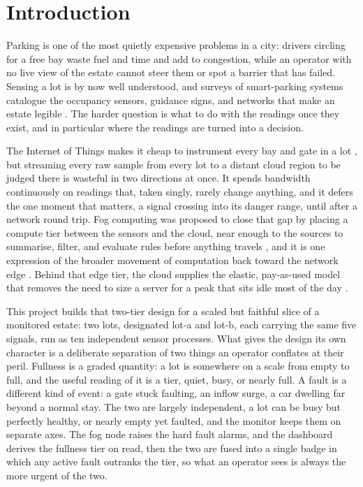 \documentclass[conference]{IEEEtran}
\begin{document}
\section{Introduction}

Parking is one of the most quietly expensive problems in a city: drivers circling for a free bay waste fuel and time and add to congestion, while an operator with no live view of the estate cannot steer them or spot a barrier that has failed. Sensing a lot is by now well understood, and surveys of smart-parking systems catalogue the occupancy sensors, guidance signs, and networks that make an estate legible \cite{lin2017, polycarpou2013}. The harder question is what to do with the readings once they exist, and in particular where the readings are turned into a decision.

The Internet of Things makes it cheap to instrument every bay and gate in a lot \cite{atzori2010}, but streaming every raw sample from every lot to a distant cloud region to be judged there is wasteful in two directions at once. It spends bandwidth continuously on readings that, taken singly, rarely change anything, and it defers the one moment that matters, a signal crossing into its danger range, until after a network round trip. Fog computing was proposed to close that gap by placing a compute tier between the sensors and the cloud, near enough to the sources to summarise, filter, and evaluate rules before anything travels \cite{bonomi2012, yousefpour2019}, and it is one expression of the broader movement of computation back toward the network edge \cite{shi2016, satyanarayanan2017}. Behind that edge tier, the cloud supplies the elastic, pay-as-used model that removes the need to size a server for a peak that sits idle most of the day \cite{armbrust2010}.

This project builds that two-tier design for a scaled but faithful slice of a monitored estate: two lots, designated lot-a and lot-b, each carrying the same five signals, run as ten independent sensor processes. What gives the design its own character is a deliberate separation of two things an operator conflates at their peril. Fullness is a graded quantity: a lot is somewhere on a scale from empty to full, and the useful reading of it is a tier, quiet, busy, or nearly full. A fault is a different kind of event: a gate stuck faulting, an inflow surge, a car dwelling far beyond a normal stay. The two are largely independent, a lot can be busy but perfectly healthy, or nearly empty yet faulted, and the monitor keeps them on separate axes. The fog node raises the hard fault alarms, and the dashboard derives the fullness tier on read, then the two are fused into a single badge in which any active fault outranks the tier, so what an operator sees is always the more urgent of the two.
\end{document}

